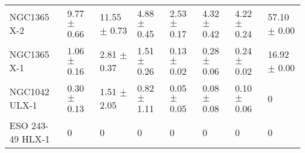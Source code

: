 \begin{tabular}{llllllll}
       NGC1365 X-2 &   9.77 $\pm$ 0.66 &  11.55 $\pm$ 0.73 &   4.88 $\pm$ 0.45 &  2.53 $\pm$ 0.17 &   4.32 $\pm$ 0.42 &  4.22 $\pm$ 0.24 &  57.10 $\pm$ 0.00 \\
       NGC1365 X-1 &   1.06 $\pm$ 0.16 &   2.81 $\pm$ 0.37 &   1.51 $\pm$ 0.26 &  0.13 $\pm$ 0.02 &   0.28 $\pm$ 0.06 &  0.24 $\pm$ 0.02 &  16.92 $\pm$ 0.00 \\
     NGC1042 ULX-1 &   0.30 $\pm$ 0.13 &   1.51 $\pm$ 2.05 &   0.82 $\pm$ 1.11 &  0.05 $\pm$ 0.05 &   0.08 $\pm$ 0.08 &  0.10 $\pm$ 0.06 &                 0 \\
  ESO 243-49 HLX-1 &                 0 &                 0 &                 0 &                0 &                 0 &                0 &                 0 \\
\bottomrule
\end{tabular}
